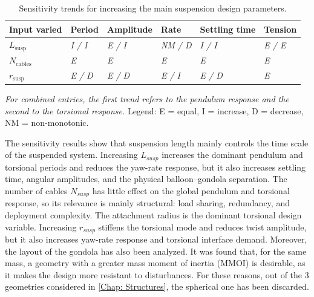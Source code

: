 \begin{table}[htbp]
\centering
\caption{Sensitivity trends for increasing the main suspension design parameters.}
\label{tab:adcs_sensitivity_trends}

\renewcommand{\arraystretch}{1.35}

\begin{tabularx}{0.92\textwidth}{
>{\raggedright\arraybackslash}p{2.6cm}
>{\centering\arraybackslash}X
>{\centering\arraybackslash}X
>{\centering\arraybackslash}X
>{\centering\arraybackslash}X
>{\centering\arraybackslash}X
}
\toprule

\textbf{Input varied} &
\textbf{Period} &
\textbf{Amplitude} &
\textbf{Rate} &
\textbf{Settling time} &
\textbf{Tension} \\

\midrule

$L_{\mathrm{susp}}$
& \textit{I / I}
& \textit{E / I}
& \textit{NM / D}
& \textit{I / I}
& \textit{E / E} \\

$N_{\mathrm{cables}}$
& \textit{E}
& \textit{E}
& \textit{E}
& \textit{E}
& \textit{E} \\

$r_{\mathrm{susp}}$
& \textit{E / D}
& \textit{E / D}
& \textit{E / I}
& \textit{E / D}
& \textit{E} \\

\bottomrule
\end{tabularx}

\vspace{0.3cm}

\begin{minipage}{0.92\textwidth}
\footnotesize
\textit{For combined entries, the first trend refers to the pendulum response and the second to the torsional response.}
Legend: E = equal, I = increase, D = decrease, NM = non-monotonic.
\end{minipage}

\end{table}

The sensitivity results show that suspension length mainly controls the time scale of the suspended system. Increasing $L_{susp}$ increases the dominant pendulum and torsional periods and reduces the yaw-rate response, but it also increases settling time, angular amplitudes, and the physical balloon--gondola separation. The number of cables $N_{susp}$ has little effect on the global pendulum and torsional response, so its relevance is mainly structural: load sharing, redundancy, and deployment complexity. The attachment radius is the dominant torsional design variable. Increasing $r_{susp}$ stiffens the torsional mode and reduces twist amplitude, but it also increases yaw-rate response and torsional interface demand. Moreover, the layout of the gondola has also been analyzed. It was found that, for the same mass, a geometry with a greater mass moment of inertia (MMOI) is desirable, as it makes the design more resistant to disturbances. For these reasons, out of the 3 geometries considered in \autoref{Chap: Structures}, the spherical one has been discarded.

